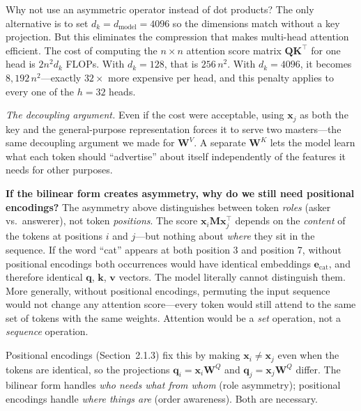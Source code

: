 \begin{whynotbox}{Why not use an asymmetric operator instead of dot products?}
The only alternative is to set $d_k = d_{\text{model}} = 4096$ so the dimensions match without a key projection. But this eliminates the compression that makes multi-head attention efficient. The cost of computing the $n \times n$ attention score matrix $\mathbf{Q}\mathbf{K}^\top$ for one head is $2n^2 d_k$ FLOPs. With $d_k = 128$, that is $256\,n^2$. With $d_k = 4096$, it becomes $8{,}192\,n^2$---exactly $32\times$ more expensive per head, and this penalty applies to every one of the $h = 32$ heads.

\emph{The decoupling argument.} Even if the cost were acceptable, using $\mathbf{x}_j$ as both the key and the general-purpose representation forces it to serve two masters---the same decoupling argument we made for $\mathbf{W}^V$. A separate $\mathbf{W}^K$ lets the model learn what each token should ``advertise'' about itself independently of the features it needs for other purposes.
\end{whynotbox}

\textbf{If the bilinear form creates asymmetry, why do we still need positional encodings?}\hspace{1em} The asymmetry above distinguishes between token \emph{roles} (asker vs.\ answerer), not token \emph{positions}. The score $\mathbf{x}_i \mathbf{M} \mathbf{x}_j^\top$ depends on the \emph{content} of the tokens at positions $i$ and $j$---but nothing about \emph{where} they sit in the sequence. If the word ``cat'' appears at both position 3 and position 7, without positional encodings both occurrences would have identical embeddings $\mathbf{e}_{\text{cat}}$, and therefore identical $\mathbf{q}$, $\mathbf{k}$, $\mathbf{v}$ vectors. The model literally cannot distinguish them. More generally, without positional encodings, permuting the input sequence would not change any attention score---every token would still attend to the same set of tokens with the same weights. Attention would be a \emph{set} operation, not a \emph{sequence} operation.

Positional encodings (Section~2.1.3) fix this by making $\mathbf{x}_i \neq \mathbf{x}_j$ even when the tokens are identical, so the projections $\mathbf{q}_i = \mathbf{x}_i \mathbf{W}^Q$ and $\mathbf{q}_j = \mathbf{x}_j \mathbf{W}^Q$ differ. The bilinear form handles \emph{who needs what from whom} (role asymmetry); positional encodings handle \emph{where things are} (order awareness). Both are necessary.

